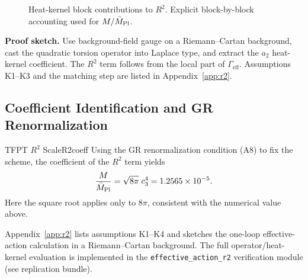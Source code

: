 \begin{figure}[H]
\centering
{}
\caption{Heat-kernel block contributions to $R^2$. Explicit block-by-block accounting used for $M/\bar M_{\rm Pl}$.}
\label{fig:r2-blocks}
\end{figure}

\textbf{Proof sketch.} Use background-field gauge on a Riemann--Cartan background, cast the
quadratic torsion operator into Laplace type, and extract the $a_2$ heat-kernel coefficient.
The $R^2$ term follows from the local part of $\Gamma_{\mathrm{eff}}$. Assumptions K1--K3 and
the matching step are listed in Appendix~\ref{app:r2}.

\subsection{Coefficient Identification and GR Renormalization}

\begin{theorem}{TFPT $R^2$ Scale}{R2coeff}
Using the GR renormalization condition (A8) to fix the scheme, the coefficient of the
$R^2$ term yields
\begin{equation}
    \frac{M}{\bar{M}_{\mathrm{Pl}}}=\sqrt{8\pi}\;c_3^4
    = 1.2565\times 10^{-5}.
    \label{eq:R2scale}
\end{equation}
Here the square root applies only to $8\pi$, consistent with the numerical value above.
\end{theorem}

\begin{tcolorbox}[colback=green!3, colframe=green!50!black, 
    title={\textbf{Derivation Provided (Conditional)}}, fonttitle=\bfseries\small]
Appendix~\ref{app:r2} lists assumptions K1--K4 and sketches the one-loop effective-action
calculation in a Riemann--Cartan background. The full operator/heat-kernel evaluation is
implemented in the \texttt{effective\_action\_r2} verification module (see replication bundle).
\end{tcolorbox}

